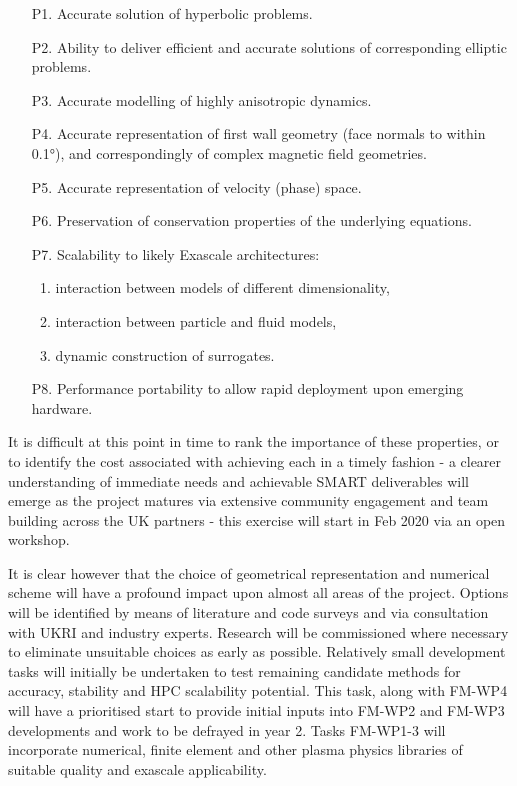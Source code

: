 \begin{itemize}
\item[P1.] Accurate solution of hyperbolic problems.

\item[P2.] Ability to deliver efficient and accurate solutions of corresponding elliptic 
problems.

\item[P3.] Accurate modelling of highly anisotropic dynamics. 

\item[P4.] Accurate representation of first wall geometry (face normals to within 0.1°), 
and correspondingly of complex magnetic field geometries.

\item[P5.] Accurate representation of velocity (phase) space.

\item[P6.] Preservation of conservation properties of the underlying equations.

\item[P7.] Scalability to likely Exascale architectures:

\begin{enumerate}
\item interaction between models of different dimensionality,

\item interaction between particle and fluid models,

\item dynamic construction of surrogates.
\end{enumerate}

\item[P8.] Performance portability to allow rapid deployment upon emerging hardware.
\end{itemize}

It is difficult at this point in time to rank the importance of these properties, 
or to identify the cost associated with achieving each in a timely fashion - a 
clearer understanding of immediate needs and achievable SMART deliverables will 
emerge as the project matures via extensive community engagement and team building 
across the UK partners - this exercise will start in Feb 2020 via an open workshop. 

It is clear however that the choice of geometrical representation and numerical 
scheme will have a profound impact upon almost all areas of the project. Options 
will be identified by means of literature and code surveys and via consultation 
with UKRI and industry experts. Research will be commissioned where necessary to 
eliminate unsuitable choices as early as possible. Relatively small development 
tasks will initially be undertaken to test remaining candidate methods for accuracy, 
stability and HPC scalability potential.  This task, along with FM-WP4 will have 
a prioritised start to provide initial inputs into FM-WP2 and FM-WP3 developments 
and work to be defrayed in year 2. Tasks FM-WP1-3 will incorporate numerical, finite 
element and other plasma physics libraries of suitable quality and exascale applicability.

